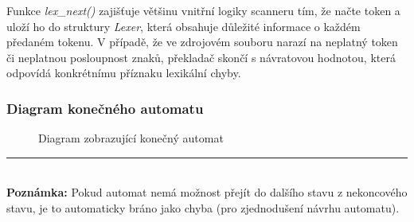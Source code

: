 \documentclass[a4paper, 12pt]{article} %
\begin{document}
            Funkce \textit{lex\_next()} zajišťuje většinu vnitřní logiky scanneru tím, že načte 
            token a uloží ho do struktury \textit{Lexer}, která obsahuje důležité informace o každém 
            předaném tokenu. V případě, že ve zdrojovém souboru narazí na neplatný token či neplatnou
            posloupnost znaků, překladač skončí s návratovou hodnotou, která odpovídá konkrétnímu 
            příznaku lexikální chyby. 


            \newpage
            \subsubsection{Diagram konečného automatu}\label{kodiagram}
                \begin{figure}[H]
                    \centering
                    \caption{Diagram zobrazující konečný automat}
                \end{figure}

                \rule{5cm}{0.4pt} \\
                {\footnotesize \textbf{Poznámka:} Pokud automat nemá možnost přejít do dalšího stavu z 
                nekoncového stavu, je to automaticky bráno jako chyba (pro zjednodušení návrhu
                automatu).}
            \newpage
\end{document}
